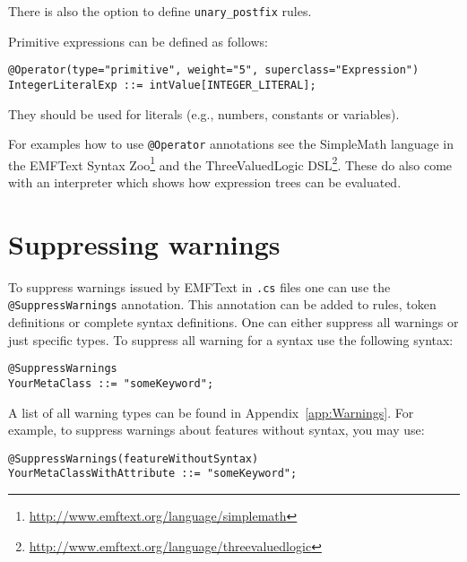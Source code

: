 There is also the option to define \texttt{unary\_postfix} rules.

Primitive expressions can be defined as follows:

\begin{lstlisting}
@Operator(type="primitive", weight="5", superclass="Expression")
IntegerLiteralExp ::= intValue[INTEGER_LITERAL];
\end{lstlisting}

They should be used for literals (e.g., numbers, constants or variables).

For examples how to use \texttt{@Operator} annotations see the SimpleMath
language in the EMFText Syntax
Zoo\footnote{\url{http://www.emftext.org/language/simplemath}} and the
ThreeValuedLogic
DSL\footnote{\url{http://www.emftext.org/language/threevaluedlogic}}. These do
also come with an interpreter which shows how expression trees can be evaluated.

\section{Suppressing warnings}

To suppress warnings issued by EMFText in \texttt{.cs} files one can use the
\texttt{@SuppressWarnings} annotation. This annotation can be added to rules,
token definitions or complete syntax definitions. One can either suppress all 
warnings or just specific types. To suppress all warning for a syntax use the
following syntax:

\begin{lstlisting}
@SuppressWarnings
YourMetaClass ::= "someKeyword";
\end{lstlisting}

A list of all warning types can be found in Appendix~\ref{app:Warnings}. For
example, to suppress warnings about features without syntax, you may use:

\begin{lstlisting}
@SuppressWarnings(featureWithoutSyntax)
YourMetaClassWithAttribute ::= "someKeyword";
\end{lstlisting}
